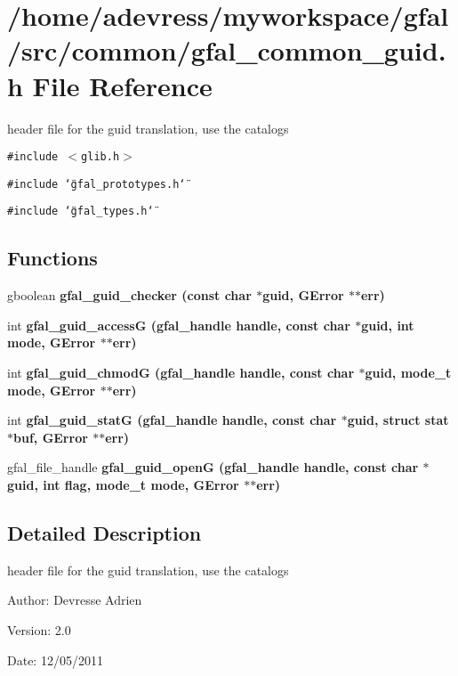 \section{/home/adevress/myworkspace/gfal/src/common/gfal\_\-common\_\-guid.h File Reference}
\label{gfal__common__guid_8h}
header file for the guid translation, use the catalogs 

{\tt \#include $<$glib.h$>$}\par
{\tt \#include \char`\"{}gfal\_\-prototypes.h\char`\"{}}\par
{\tt \#include \char`\"{}gfal\_\-types.h\char`\"{}}\par
\subsection*{Functions}
\begin{CompactItemize}
\item 
gboolean \bf{gfal\_\-guid\_\-checker} (const char $\ast$guid, GError $\ast$$\ast$err)
\item 
int \bf{gfal\_\-guid\_\-access\-G} (gfal\_\-handle handle, const char $\ast$guid, int mode, GError $\ast$$\ast$err)
\item 
int \bf{gfal\_\-guid\_\-chmod\-G} (gfal\_\-handle handle, const char $\ast$guid, mode\_\-t mode, GError $\ast$$\ast$err)
\item 
int \bf{gfal\_\-guid\_\-stat\-G} (gfal\_\-handle handle, const char $\ast$guid, struct stat $\ast$buf, GError $\ast$$\ast$err)
\item 
gfal\_\-file\_\-handle \bf{gfal\_\-guid\_\-open\-G} (gfal\_\-handle handle, const char $\ast$guid, int flag, mode\_\-t mode, GError $\ast$$\ast$err)
\end{CompactItemize}


\subsection{Detailed Description}
header file for the guid translation, use the catalogs 

\begin{Desc}
\item[Author:]Devresse Adrien \end{Desc}
\begin{Desc}
\item[Version:]2.0 \end{Desc}
\begin{Desc}
\item[Date:]12/05/2011 \end{Desc}


